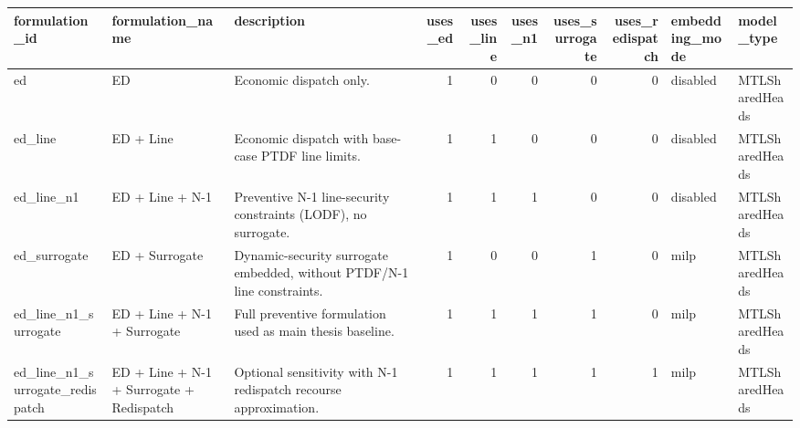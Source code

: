 \begin{tabular}{lllrrrrrll}
\toprule
formulation\_id & formulation\_name & description & uses\_ed & uses\_line & uses\_n1 & uses\_surrogate & uses\_redispatch & embedding\_mode & model\_type \\
\midrule
ed & ED & Economic dispatch only. & 1 & 0 & 0 & 0 & 0 & disabled & MTLSharedHeads \\
ed\_line & ED + Line & Economic dispatch with base-case PTDF line limits. & 1 & 1 & 0 & 0 & 0 & disabled & MTLSharedHeads \\
ed\_line\_n1 & ED + Line + N-1 & Preventive N-1 line-security constraints (LODF), no surrogate. & 1 & 1 & 1 & 0 & 0 & disabled & MTLSharedHeads \\
ed\_surrogate & ED + Surrogate & Dynamic-security surrogate embedded, without PTDF/N-1 line constraints. & 1 & 0 & 0 & 1 & 0 & milp & MTLSharedHeads \\
ed\_line\_n1\_surrogate & ED + Line + N-1 + Surrogate & Full preventive formulation used as main thesis baseline. & 1 & 1 & 1 & 1 & 0 & milp & MTLSharedHeads \\
ed\_line\_n1\_surrogate\_redispatch & ED + Line + N-1 + Surrogate + Redispatch & Optional sensitivity with N-1 redispatch recourse approximation. & 1 & 1 & 1 & 1 & 1 & milp & MTLSharedHeads \\
\bottomrule
\end{tabular}
